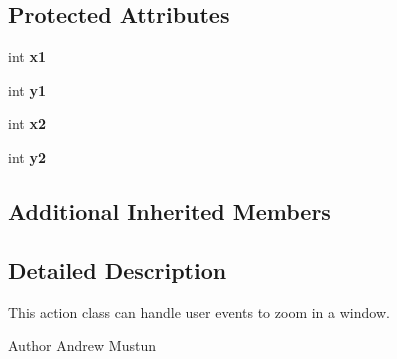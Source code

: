 \subsection*{Protected Attributes}
\begin{DoxyCompactItemize}
\item 
\hypertarget{classRS__ActionZoomPan_ad33286e57a5dae6e9096005111279968}{int {\bfseries x1}}\label{classRS__ActionZoomPan_ad33286e57a5dae6e9096005111279968}

\item 
\hypertarget{classRS__ActionZoomPan_accffd68423ac13d9b905b920b5b9a680}{int {\bfseries y1}}\label{classRS__ActionZoomPan_accffd68423ac13d9b905b920b5b9a680}

\item 
\hypertarget{classRS__ActionZoomPan_ab291e1c656b8827a72ff0115ef900e1a}{int {\bfseries x2}}\label{classRS__ActionZoomPan_ab291e1c656b8827a72ff0115ef900e1a}

\item 
\hypertarget{classRS__ActionZoomPan_a5791656015bff0fa14b1f0a94cb7a5e2}{int {\bfseries y2}}\label{classRS__ActionZoomPan_a5791656015bff0fa14b1f0a94cb7a5e2}

\end{DoxyCompactItemize}
\subsection*{Additional Inherited Members}


\subsection{Detailed Description}
This action class can handle user events to zoom in a window.

\begin{DoxyAuthor}{Author}
Andrew Mustun 
\end{DoxyAuthor}


